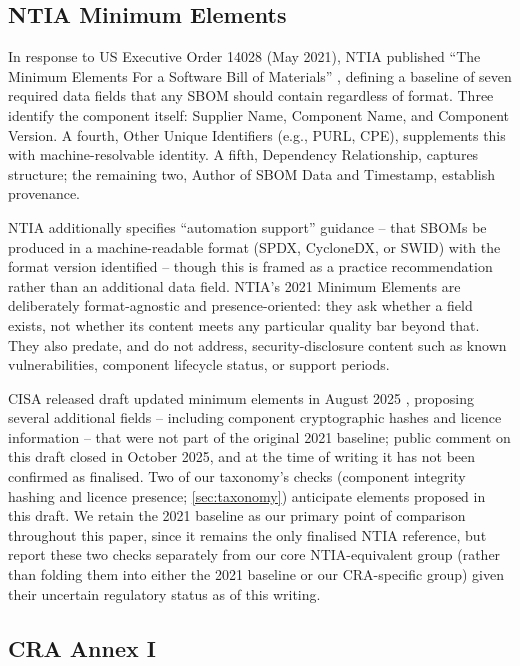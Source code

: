 \documentclass[11pt]{article}
\begin{document}
\subsection{NTIA Minimum Elements}

In response to US Executive Order 14028 (May 2021), NTIA published ``The Minimum Elements For a Software Bill of Materials'' \cite{ntia2021}, defining a baseline of seven required data fields that any SBOM should contain regardless of format. Three identify the component itself: Supplier Name, Component Name, and Component Version. A fourth, Other Unique Identifiers (e.g., PURL, CPE), supplements this with machine-resolvable identity. A fifth, Dependency Relationship, captures structure; the remaining two, Author of SBOM Data and Timestamp, establish provenance.

NTIA additionally specifies ``automation support'' guidance -- that SBOMs be produced in a machine-readable format (SPDX, CycloneDX, or SWID) with the format version identified -- though this is framed as a practice recommendation rather than an additional data field. NTIA's 2021 Minimum Elements are deliberately format-agnostic and presence-oriented: they ask whether a field exists, not whether its content meets any particular quality bar beyond that. They also predate, and do not address, security-disclosure content such as known vulnerabilities, component lifecycle status, or support periods.

CISA released draft updated minimum elements in August 2025 \cite{cisa2025}, proposing several additional fields -- including component cryptographic hashes and licence information -- that were not part of the original 2021 baseline; public comment on this draft closed in October 2025, and at the time of writing it has not been confirmed as finalised. Two of our taxonomy's checks (component integrity hashing and licence presence; \cref{sec:taxonomy}) anticipate elements proposed in this draft. We retain the 2021 baseline as our primary point of comparison throughout this paper, since it remains the only finalised NTIA reference, but report these two checks separately from our core NTIA-equivalent group (rather than folding them into either the 2021 baseline or our CRA-specific group) given their uncertain regulatory status as of this writing.

\subsection{CRA Annex I}
\label{sec:cra-background}
\end{document}
